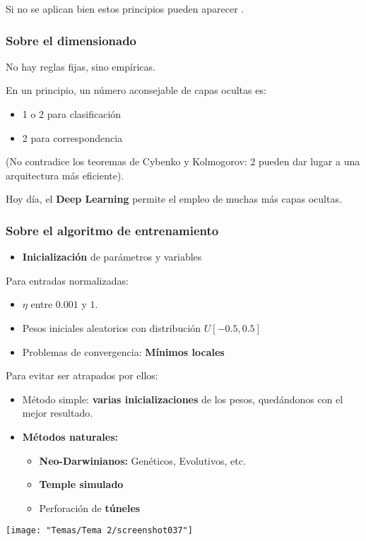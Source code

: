 Si no se aplican bien estos principios pueden aparecer .

\subsubsection{Sobre el dimensionado}

No hay reglas fijas, sino empíricas.

En un principio, un número aconsejable de capas ocultas es:
\begin{itemize}
	\item 1 o 2 para clasificación
	\item 2 para correspondencia
\end{itemize}
(No contradice los teoremas de Cybenko y Kolmogorov: 2 pueden dar lugar a una arquitectura más eficiente).

Hoy día, el \textbf{Deep Learning} permite el empleo de muchas más capas ocultas.
\subsubsection{Sobre el algoritmo de entrenamiento}
\begin{itemize}[label=\color{red}\textbullet, leftmargin=*]
	\item \color{lightblue}\textbf{Inicialización} de parámetros y variables
\end{itemize}
Para entradas normalizadas:
\begin{itemize}
	\item $\eta$ entre $0.001$ y $1$.
	\item Pesos iniciales aleatorios con distribución $U[-0.5,0.5]$
\end{itemize}

\begin{minipage}{0.5\textwidth}
	\begin{itemize}[label=\color{red}\textbullet, leftmargin=*]
		\item \color{lightblue}Problemas de convergencia: \textbf{Mínimos locales}
	\end{itemize}
	Para evitar ser atrapados por ellos:
	\begin{itemize}
		\item Método simple: \textbf{varias inicializaciones} de los pesos, quedándonos con el mejor resultado.
		\item \textbf{Métodos naturales:}
		\begin{itemize}
			\item \textbf{Neo-Darwinianos:} Genéticos, Evolutivos, etc.
			\item \textbf{Temple simulado}
			\item Perforación de \textbf{túneles}
		\end{itemize}
	\end{itemize}
\end{minipage}\qquad\begin{minipage}{0.5\textwidth}
\begin{center}
	\texttt{[image: "Temas/Tema 2/screenshot037"]}
\end{center}
\end{minipage}

